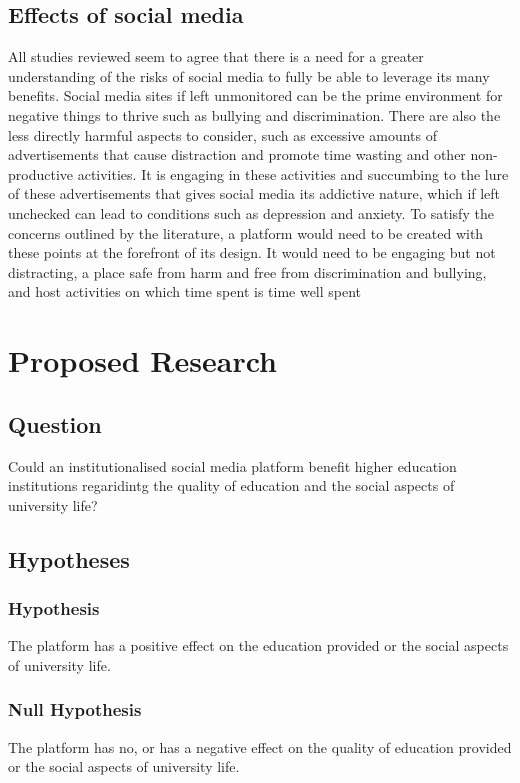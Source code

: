 \documentclass[lettersize,journal]{IEEEtran}
\begin{document}
	\subsection{Effects of social media}
	All studies reviewed seem to agree that there is a need for a greater understanding of the risks of social media to fully
	 be able to leverage its many benefits. Social media sites if left unmonitored can be the prime environment for negative things to thrive 
	 such as bullying and discrimination. There are also the less directly harmful aspects to consider, such as excessive amounts of advertisements that 
	 cause distraction and promote time wasting and other non-productive activities. It is engaging in these activities and succumbing to the lure of
	 these advertisements that gives social media its addictive nature, which if left unchecked can lead to conditions such as depression and anxiety.
	 To satisfy the concerns outlined by the literature, a platform would need to be created with these points at the forefront of its design.
	 It would need to be engaging but not distracting, a place safe from harm and free from discrimination and bullying, and host activities on
	 which time spent is time well spent\section{Proposed Research}
	\subsection{Question}
	    Could an institutionalised social media platform benefit higher education institutions regaridintg the quality of
	    education and the social aspects of university life?

	\subsection{Hypotheses}
		\subsubsection{Hypothesis}
   		 The platform has a positive effect on the education provided or the social
    		 aspects of university life.


		\subsubsection{Null Hypothesis}
		The platform has no, or has a negative effect on the quality of education provided or the
    		social aspects of university life.
\end{document}
